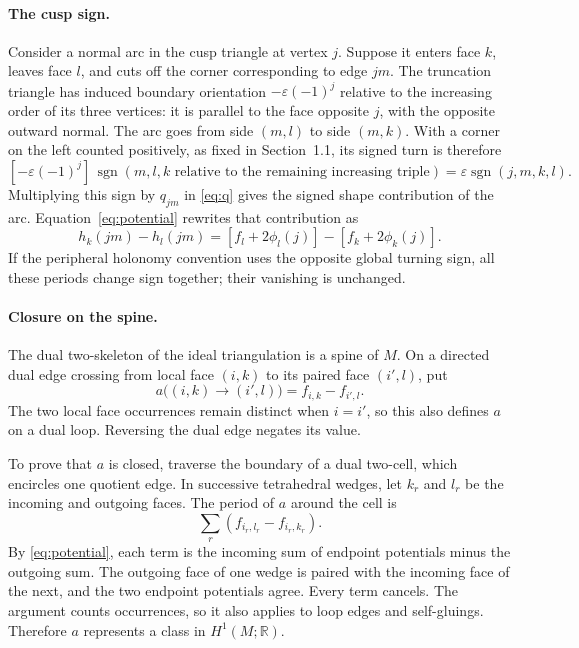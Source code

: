 \documentclass[11pt]{article}
\theoremstyle{definition}\newtheorem{definition}[theorem]{Definition}
\theoremstyle{remark}\newtheorem{remark}[theorem]{Remark}
\newcommand{\R}{\mathbb R}
\newcommand{\eps}{\varepsilon}
\begin{document}
\paragraph{The cusp sign.}
Consider a normal arc in the cusp triangle at vertex $j$. Suppose it
enters face $k$, leaves face $l$, and cuts off the corner corresponding
to edge $jm$. The truncation triangle has induced boundary orientation
$-\eps(-1)^j$ relative to the increasing order of its three vertices:
it is parallel to the face opposite $j$, with the opposite outward
normal. The arc goes from side $(m,l)$ to side $(m,k)$. With a corner
on the left counted positively, as fixed in Section~1.1, its signed
turn is therefore
\[
[-\eps(-1)^j]\,\operatorname{sgn}
(m,l,k\text{ relative to the remaining increasing triple})
=\eps\operatorname{sgn}(j,m,k,l).
\]
Multiplying this sign by $q_{jm}$ in \eqref{eq:q} gives the signed
shape contribution of the arc. Equation~\eqref{eq:potential} rewrites
that contribution as
\begin{equation}
h_k(jm)-h_l(jm)
=[f_l+2\phi_l(j)]-[f_k+2\phi_k(j)].
\label{eq:arc}
\end{equation}
If the peripheral holonomy convention uses the opposite global turning
sign, all these periods change sign together; their vanishing is
unchanged.

\paragraph{Closure on the spine.}
The dual two-skeleton of the ideal triangulation is a spine of $M$.
On a directed dual edge crossing from local face $(i,k)$ to its paired
face $(i',l)$, put
\[
a\big((i,k)\longrightarrow(i',l)\big)=f_{i,k}-f_{i',l}.
\]
The two local face occurrences remain distinct when $i=i'$, so this
also defines $a$ on a dual loop. Reversing the dual edge negates its
value.

To prove that $a$ is closed, traverse the boundary of a dual two-cell,
which encircles one quotient edge. In successive tetrahedral wedges,
let $k_r$ and $l_r$ be the incoming and outgoing faces. The period of
$a$ around the cell is
\[
\sum_r(f_{i_r,l_r}-f_{i_r,k_r}).
\]
By \eqref{eq:potential}, each term is the incoming sum of endpoint
potentials minus the outgoing sum. The outgoing face of one wedge is
paired with the incoming face of the next, and the two endpoint
potentials agree. Every term cancels. The argument counts occurrences,
so it also applies to loop edges and self-gluings. Therefore $a$
represents a class in $H^1(M;\R)$.
\end{document}
